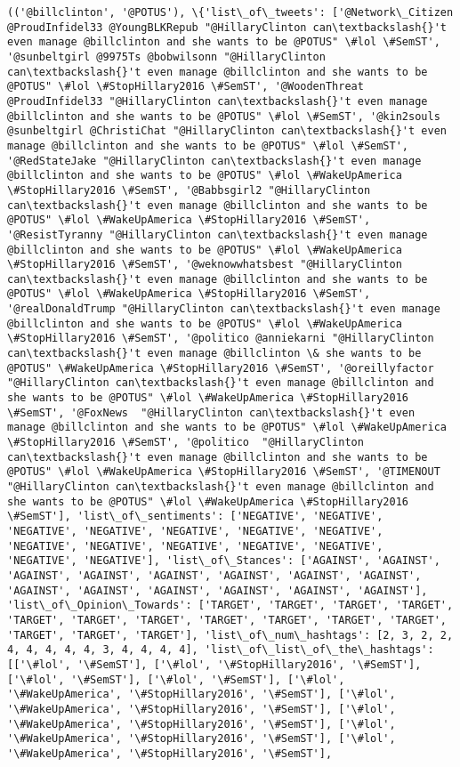 \documentclass[11pt]{article}
\begin{document}
\begin{Verbatim}[commandchars=\\\{\}]
(('@billclinton', '@POTUS'), \{'list\_of\_tweets': ['@Network\_Citizen @ProudInfidel33 @YoungBLKRepub "@HillaryClinton can\textbackslash{}'t even manage @billclinton and she wants to be @POTUS" \#lol \#SemST', '@sunbeltgirl @9975Ts @bobwilsonn "@HillaryClinton can\textbackslash{}'t even manage @billclinton and she wants to be @POTUS" \#lol \#StopHillary2016 \#SemST', '@WoodenThreat @ProudInfidel33 "@HillaryClinton can\textbackslash{}'t even manage @billclinton and she wants to be @POTUS" \#lol \#SemST', '@kin2souls @sunbeltgirl @ChristiChat "@HillaryClinton can\textbackslash{}'t even manage @billclinton and she wants to be @POTUS" \#lol \#SemST', '@RedStateJake "@HillaryClinton can\textbackslash{}'t even manage @billclinton and she wants to be @POTUS" \#lol \#WakeUpAmerica \#StopHillary2016 \#SemST', '@Babbsgirl2 "@HillaryClinton can\textbackslash{}'t even manage @billclinton and she wants to be @POTUS" \#lol \#WakeUpAmerica \#StopHillary2016 \#SemST', '@ResistTyranny "@HillaryClinton can\textbackslash{}'t even manage @billclinton and she wants to be @POTUS" \#lol \#WakeUpAmerica \#StopHillary2016 \#SemST', '@weknowwhatsbest "@HillaryClinton can\textbackslash{}'t even manage @billclinton and she wants to be @POTUS" \#lol \#WakeUpAmerica \#StopHillary2016 \#SemST', '@realDonaldTrump "@HillaryClinton can\textbackslash{}'t even manage @billclinton and she wants to be @POTUS" \#lol \#WakeUpAmerica \#StopHillary2016 \#SemST', '@politico @anniekarni "@HillaryClinton can\textbackslash{}'t even manage @billclinton \& she wants to be @POTUS" \#WakeUpAmerica \#StopHillary2016 \#SemST', '@oreillyfactor "@HillaryClinton can\textbackslash{}'t even manage @billclinton and she wants to be @POTUS" \#lol \#WakeUpAmerica \#StopHillary2016 \#SemST', '@FoxNews  "@HillaryClinton can\textbackslash{}'t even manage @billclinton and she wants to be @POTUS" \#lol \#WakeUpAmerica \#StopHillary2016 \#SemST', '@politico  "@HillaryClinton can\textbackslash{}'t even manage @billclinton and she wants to be @POTUS" \#lol \#WakeUpAmerica \#StopHillary2016 \#SemST', '@TIMENOUT  "@HillaryClinton can\textbackslash{}'t even manage @billclinton and she wants to be @POTUS" \#lol \#WakeUpAmerica \#StopHillary2016 \#SemST'], 'list\_of\_sentiments': ['NEGATIVE', 'NEGATIVE', 'NEGATIVE', 'NEGATIVE', 'NEGATIVE', 'NEGATIVE', 'NEGATIVE', 'NEGATIVE', 'NEGATIVE', 'NEGATIVE', 'NEGATIVE', 'NEGATIVE', 'NEGATIVE', 'NEGATIVE'], 'list\_of\_Stances': ['AGAINST', 'AGAINST', 'AGAINST', 'AGAINST', 'AGAINST', 'AGAINST', 'AGAINST', 'AGAINST', 'AGAINST', 'AGAINST', 'AGAINST', 'AGAINST', 'AGAINST', 'AGAINST'], 'list\_of\_Opinion\_Towards': ['TARGET', 'TARGET', 'TARGET', 'TARGET', 'TARGET', 'TARGET', 'TARGET', 'TARGET', 'TARGET', 'TARGET', 'TARGET', 'TARGET', 'TARGET', 'TARGET'], 'list\_of\_num\_hashtags': [2, 3, 2, 2, 4, 4, 4, 4, 4, 3, 4, 4, 4, 4], 'list\_of\_list\_of\_the\_hashtags': [['\#lol', '\#SemST'], ['\#lol', '\#StopHillary2016', '\#SemST'], ['\#lol', '\#SemST'], ['\#lol', '\#SemST'], ['\#lol', '\#WakeUpAmerica', '\#StopHillary2016', '\#SemST'], ['\#lol', '\#WakeUpAmerica', '\#StopHillary2016', '\#SemST'], ['\#lol', '\#WakeUpAmerica', '\#StopHillary2016', '\#SemST'], ['\#lol', '\#WakeUpAmerica', '\#StopHillary2016', '\#SemST'], ['\#lol', '\#WakeUpAmerica', '\#StopHillary2016', '\#SemST'], 
\end{Verbatim}
\end{document}
